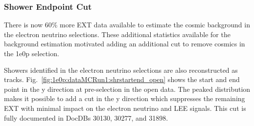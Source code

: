 \subsubsection{Shower Endpoint Cut}
\label{sec:sideband:newcuts:shrendpoint}
There is now 60\% more EXT data available to estimate the cosmic background in the electron neutrino selections.  These additional statistics available for the background estimation motivated adding an additional cut to remove cosmics in the 1e0p selection.  

Showers identified in the electron neutrino selections are also reconstructed as tracks.  Fig.~\ref{fig:1e0p:dataMCRun1:shrstartend_open} shows the start and end point in the y direction at pre-selection in the open data. The peaked distribution makes it possible to add a cut in the y direction which suppresses the remaining EXT with minimal impact on the electron neutrino and LEE signals. This cut is fully documented in DocDBs 30130, 30277, and 31898.

